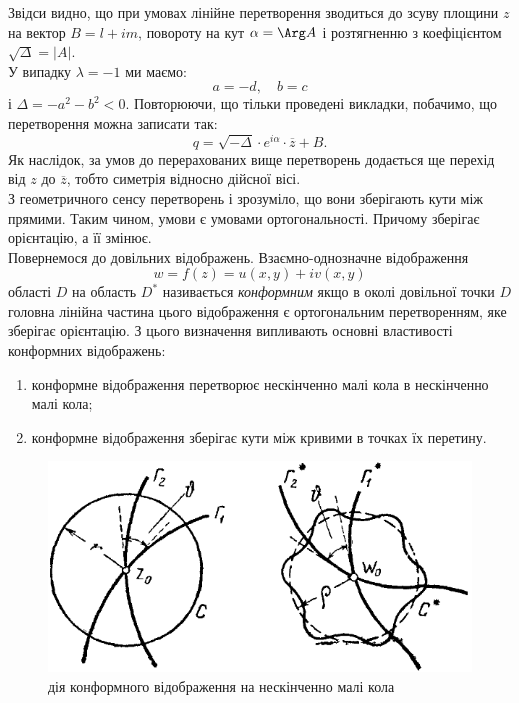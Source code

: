 Звідси видно, що при умовах  лінійне перетворення  зводиться до зсуву площини $z$ на вектор $B = l + i m$, повороту на кут $\alpha = \Arg A$ і розтягненню з коефіцієнтом $\sqrt{\Delta} = |A|$. \\

У випадку $\lambda = -1$ ми маємо:
\begin{equation}
    \label{eq:27.14}
    a = - d, \quad b = c
\end{equation}
і $\Delta = - a^2 - b^2 < 0$. Повторюючи, що тільки проведені викладки, побачимо, що перетворення  можна записати так:
\begin{equation}
    \label{eq:27.15}
    q = \sqrt{-\Delta} \cdot e^{i \alpha} \cdot \overline{z} + B.
\end{equation}
Як наслідок, за умов  до перерахованих вище перетворень додається ще перехід від $z$ до $\overline{z}$, тобто симетрія відносно дійсної вісі. \\

З геометричного сенсу перетворень  і  зрозуміло, що вони зберігають кути між прямими. Таким чином, умови  є умовами ортогональності. Причому  зберігає орієнтацію, а  її змінює. \\

Повернемося до довільних відображень. Взаємно-однозначне відображення 
\begin{equation}
    \label{eq:28.1}
    w = f(z) = u(x, y) + i v(x, y)
\end{equation}
області $D$ на область $D^*$ називається \textit{конформним} якщо в околі довільної точки $D$ головна лінійна частина цього відображення є ортогональним перетворенням, яке зберігає орієнтацію. З цього визначення випливають основні властивості конформних відображень:
\begin{enumerate}
    \item конформне відображення перетворює нескінченно малі кола в нескінченно малі кола;
    \item конформне відображення зберігає кути між кривими в точках їх перетину.
\end{enumerate}
\begin{figure}[H]
    \centering
    \includegraphics[scale=.5]{mal-38.png}
    \caption{дія конформного відображення на нескінченно малі кола}
    \label{fig:38}
\end{figure}


